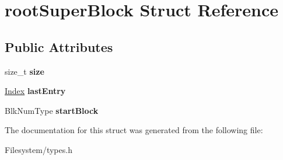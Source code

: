 \hypertarget{structrootSuperBlock}{}\section{root\+Super\+Block Struct Reference}
\label{structrootSuperBlock}
\subsection*{Public Attributes}
\begin{DoxyCompactItemize}
\item 
\mbox{\label{structrootSuperBlock_a346c6cd3ede82eb90190548d45c1789d}} 
size\+\_\+t {\bfseries size}
\item 
\mbox{\label{structrootSuperBlock_ac316fdcc2d2736d675980495d1732872}} 
\mbox{\hyperlink{structindex}{Index}} {\bfseries last\+Entry}
\item 
\mbox{\label{structrootSuperBlock_afb7d56b6d69b3f1555db0e3bce1d9612}} 
Blk\+Num\+Type {\bfseries start\+Block}
\end{DoxyCompactItemize}


The documentation for this struct was generated from the following file\+:\begin{DoxyCompactItemize}
\item 
Filesystem/types.\+h\end{DoxyCompactItemize}
